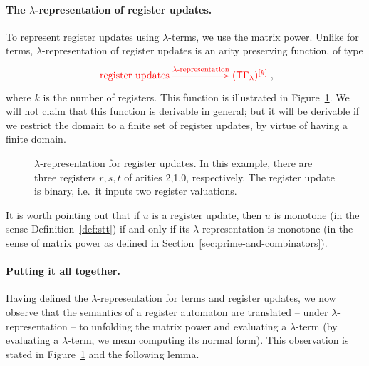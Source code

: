 \paragraph*{The $\lambda$-representation of register updates.} To represent register updates using $\lambda$-terms, we use  the matrix power. Unlike for terms,    $\lambda$-representation of register updates is an  arity preserving function, of type
\begin{align}\label{eq:lambda-representation-regup}
\ranked{
    \xymatrix@C=2cm{
 \text{register updates}    \ar[r]^-{\text{$\lambda$-representation}} &
 \mati k {(\tmonad\Gamma_\lambda)}
}
},
\end{align}
where $k$ is the number of registers. This function is illustrated in Figure~\ref{fig:labmda-representation-for-register-updates}. 
We will not claim that this function is derivable in general; but it will be derivable if we restrict the domain to a finite set of register updates, by virtue of having a finite domain.



\begin{figure}[]
    \centering
{}    
    \caption{$\lambda$-representation for register updates. In this example, there are three registers $r,s,t$ of arities 2,1,0, respectively. The register update is binary, i.e.~it inputs two register valuations.}
    \label{fig:labmda-representation-for-register-updates}
\end{figure}

It is worth pointing out that if $u$ is a register update, then $u$ is monotone (in the sense Definition~\ref{def:stt}) if and only if its $\lambda$-representation is monotone (in the sense of matrix power as defined in  Section~\ref{sec:prime-and-combinators}). 


\paragraph*{Putting it all together.}
Having defined the $\lambda$-representation for terms and register updates, we now observe  that the semantics of a register automaton are translated -- under $\lambda$-representation -- to unfolding the matrix power and evaluating a $\lambda$-term (by evaluating a $\lambda$-term, we mean computing its normal form).  This observation is stated in Figure~\ref{fig:labmda-representation-for-register-updates} and the following lemma.

